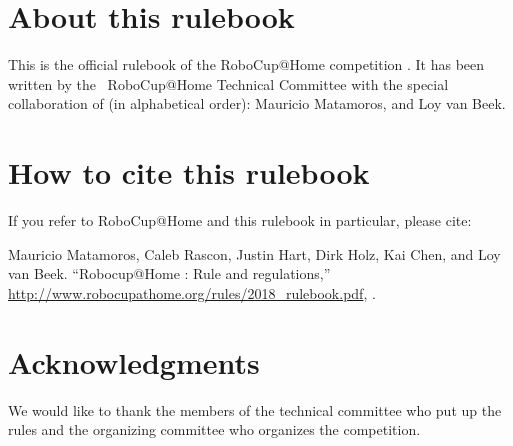 


\section*{About this rulebook}
This is the official rulebook of the RoboCup@Home competition \YEAR.
It has been written by the \YEAR ~RoboCup@Home Technical Committee with the special collaboration of (in alphabetical order):
Mauricio Matamoros,
and
Loy van Beek.



\section*{How to cite this rulebook}
If you refer to RoboCup@Home and this rulebook in particular, please cite:

Mauricio Matamoros, Caleb Rascon, Justin Hart, Dirk Holz, Kai Chen, and Loy van Beek.
\enquote{Robocup@Home \YEAR: Rule and regulations,}
\url{http://www.robocupathome.org/rules/2018_rulebook.pdf}, \YEAR.

\begin{center}
\begin{minipage}{0.8\textwidth}
	\footnotesize%
	
\end{minipage}
\end{center}

\section*{Acknowledgments}
\label{sec:acknowledgments}
We would like to thank the members of the technical committee who put up the rules and the organizing committee who organizes the competition.

